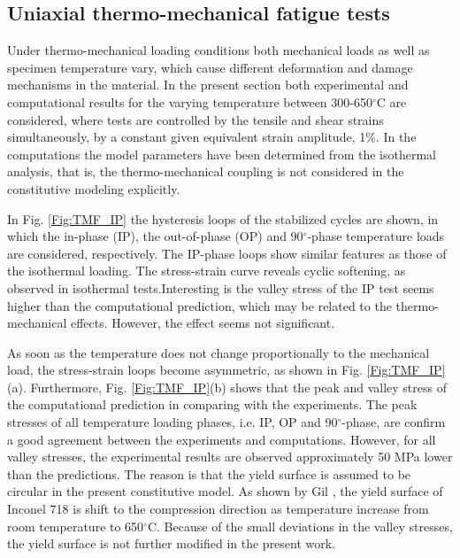 \documentclass[preprint,5p,twocolumn,11pt,sort&compress]{elsarticle}
\begin{document}
\subsection{Uniaxial thermo-mechanical fatigue tests}
Under thermo-mechanical loading conditions both mechanical loads as well as specimen temperature vary, which cause different deformation and damage mechanisms in the material.
In the present section both experimental and computational results for the varying temperature between 300-650$^{\circ}$C are considered, where tests are controlled by the tensile and shear strains simultaneously, by a constant given equivalent strain amplitude, 1\%. In the computations the model parameters have been determined from the isothermal analysis, that is, the thermo-mechanical coupling is not considered in the constitutive modeling explicitly.

In Fig. \ref{Fig:TMF_IP} the hysteresis loops of the stabilized cycles are shown, in which the in-phase (IP), the out-of-phase (OP) and 90$^\circ$-phase temperature loads are considered, respectively.
The IP-phase loops show similar features as those of the isothermal loading. 
The stress-strain curve reveals cyclic softening, as observed in isothermal tests.Interesting is the valley stress of the IP test seems higher than the computational prediction, which may be related to the thermo-mechanical effects. However, the effect seems not significant.

As soon as the temperature does not change proportionally to the mechanical load, the stress-strain loops become asymmetric, as shown in Fig. \ref{Fig:TMF_IP}(a).
Furthermore, Fig. \ref{Fig:TMF_IP}(b) shows that the peak and valley stress of the computational prediction in comparing with the experiments.
The peak stresses of all temperature loading phases, i.e. IP, OP and 90$^\circ$-phase, are confirm a good agreement between the experiments and computations.
However, for all valley stresses, the experimental results are observed approximately 50 MPa lower than the predictions.
The reason is that the yield surface is assumed to be circular in the present constitutive model.
As shown by Gil \cite{Gil1998}, the yield surface of Inconel 718 is shift to the compression direction as temperature increase from room temperature to 650$^{\circ}$C.
Because of the small deviations in the valley stresses, the yield surface is not further modified in the present work.
\end{document}
